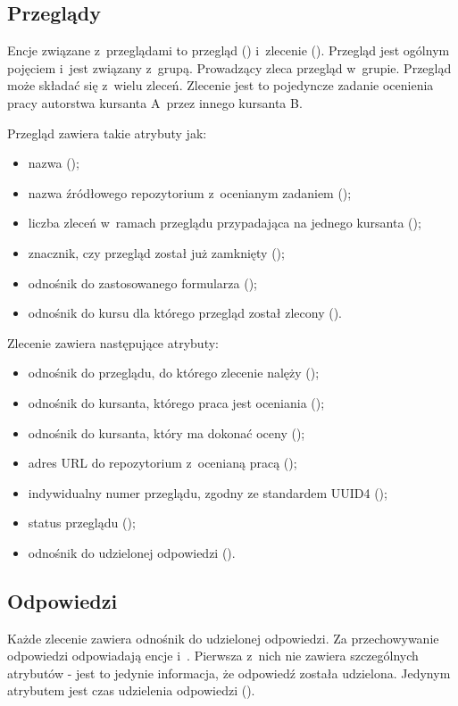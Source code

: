 \subsection{Przeglądy}
Encje związane z~przeglądami to przegląd () i~zlecenie (). Przegląd jest ogólnym pojęciem i~jest związany z~grupą. Prowadzący zleca przegląd w~grupie. Przegląd może składać się z~wielu zleceń. Zlecenie jest to pojedyncze zadanie ocenienia pracy autorstwa kursanta A~przez innego kursanta B.

\medskip
\clearpage
Przegląd zawiera takie atrybuty jak:
\begin{itemize}
    \item nazwa ();
    \item nazwa źródłowego repozytorium z~ocenianym zadaniem ();
    \item liczba zleceń w~ramach przeglądu przypadająca na jednego kursanta ();
    \item znacznik, czy przegląd został już zamknięty ();
    \item odnośnik do zastosowanego formularza ();
    \item odnośnik do kursu dla którego przegląd został zlecony ().
\end{itemize}

\medskip
Zlecenie zawiera następujące atrybuty:
\begin{itemize}
    \item odnośnik do przeglądu, do którego zlecenie nalęży ();
    \item odnośnik do kursanta, którego praca jest oceniania ();
    \item odnośnik do kursanta, który ma dokonać oceny ();
    \item adres URL do repozytorium z~ocenianą pracą ();
    \item indywidualny numer przeglądu, zgodny ze standardem UUID4 ();
    \item status przeglądu ();
    \item odnośnik do udzielonej odpowiedzi ().
\end{itemize}

\subsection{Odpowiedzi}
Każde zlecenie zawiera odnośnik do udzielonej odpowiedzi. Za przechowywanie odpowiedzi odpowiadają encje  i~. Pierwsza z~nich nie zawiera szczególnych atrybutów - jest to jedynie informacja, że odpowiedź została udzielona. Jedynym atrybutem jest czas udzielenia odpowiedzi ().

